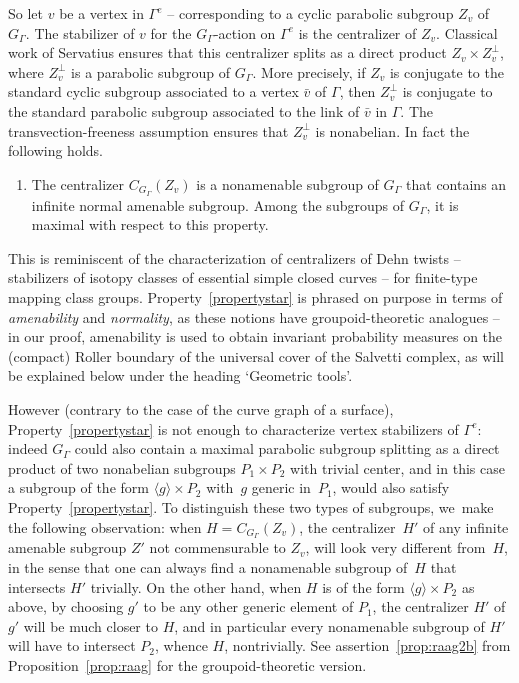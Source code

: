 \documentclass[JEP,XML,SOM,Unicode,NoFloatCountersInSection,published]{cedram}
\theoremstyle{plain}
\theoremstyle{definition}
\begin{document}
So let $v$ be a vertex in $\Gamma^e$ -- corresponding to a cyclic parabolic subgroup $Z_v$ of~$G_\Gamma$. The stabilizer of $v$ for the $G_\Gamma$-action on $\Gamma^e$ is the centralizer of $Z_v$. Classical work of Servatius \cite{Ser} ensures that this centralizer splits as a direct product $Z_v\times Z_v^{\perp}$, where $Z_v^{\perp}$ is a parabolic subgroup of $G_\Gamma$. More precisely, if $Z_v$ is conjugate to the standard cyclic subgroup associated to a vertex $\bar v$ of $\Gamma$, then $Z_v^{\perp}$ is conjugate to the standard parabolic subgroup associated to the link of $\bar v$ in $\Gamma$. The transvection-freeness assumption ensures that $Z_v^{\perp}$ is nonabelian. In fact the following holds.
\begin{enumerate}\renewcommand{\theenumi}{$*$}
\item\label{propertystar}
The centralizer $C_{G_\Gamma}(Z_v)$ is a nonamenable subgroup of $G_\Gamma$ that contains an infinite normal amenable subgroup. Among the subgroups of $G_\Gamma$, it is maximal with respect to this property.
\end{enumerate}
This is reminiscent of the characterization of centralizers of Dehn twists -- \ie stabilizers of isotopy classes of essential simple closed curves -- for finite-type mapping class groups. Property~\eqref{propertystar} is phrased on purpose in terms of \emph{amenability} and \emph{normality}, as these notions have groupoid-theoretic analogues -- in our proof, amenability is used to obtain invariant probability measures on the (compact) Roller boundary of the universal cover of the Salvetti complex, as will be explained below under the heading `Geometric tools'.\enlargethispage{.5\baselineskip}%

However (contrary to the case of the curve graph of a surface), Property~\eqref{propertystar} is not enough to characterize vertex stabilizers of $\Gamma^e$: indeed $G_\Gamma$ could also contain a maximal parabolic subgroup splitting as a direct product of two nonabelian subgroups $P_1\times P_2$ with trivial center, and in this case a subgroup of the form $\langle g\rangle \times P_2$ with~$g$ generic in~$P_1$, would also satisfy Property~\eqref{propertystar}. To distinguish these two types of subgroups, we~make the following observation: when $H=C_{G_\Gamma}(Z_v)$, the centralizer~$H'$ of any infinite amenable subgroup $Z'$ not commensurable to $Z_v$, will look very different from~$H$, in the sense that one can always find a nonamenable subgroup of~$H$ that intersects $H'$ trivially. On the other hand, when $H$ is of the form $\langle g\rangle \times P_2$ as above, by choosing $g'$ to be any other generic element of $P_1$, the centralizer $H'$ of $g'$ will be much closer to $H$, and in particular every nonamenable subgroup of $H'$ will have to intersect $P_2$, whence $H$, nontrivially. See assertion~\eqref{prop:raag2b} from Proposition~\ref{prop:raag} for the groupoid-theoretic version.
\end{document}
